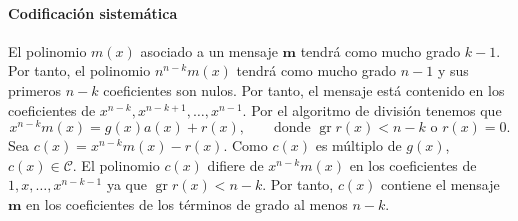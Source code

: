 \paragraph{Codificación sistemática}

El polinomio \(m(x)\) asociado a un mensaje \(\mathbf m\) tendrá como mucho grado \(k -1\).
Por tanto, el polinomio \(n^{n-k}m(x)\) tendrá como mucho grado \(n - 1\) y sus primeros \( n - k\) coeficientes son nulos.
Por tanto, el mensaje está contenido en los coeficientes de \(x^{n-k}, x^{n-k+1}, \dots, x^{n-1}\).
Por el algoritmo de división tenemos que
\[x^{n-k}m(x) = g(x)a(x) + r(x), \qquad \text{donde } \operatorname{gr} r(x) < n - k \text{ o } r(x) = 0.\]
Sea \(c(x) = x^{n-k}m(x) - r(x)\).
Como \(c(x)\) es múltiplo de \(g(x)\), \(c(x) \in \mathcal C\).
El polinomio \(c(x)\) difiere de \(x^{n-k}m(x)\) en los coeficientes de \(1, x, \dots, x^{n-k-1}\) ya que \(\operatorname{gr} r(x) < n-k\).
Por tanto, \(c(x)\) contiene el mensaje \(\mathbf m\) en los coeficientes de los términos de grado al menos \(n - k\).


